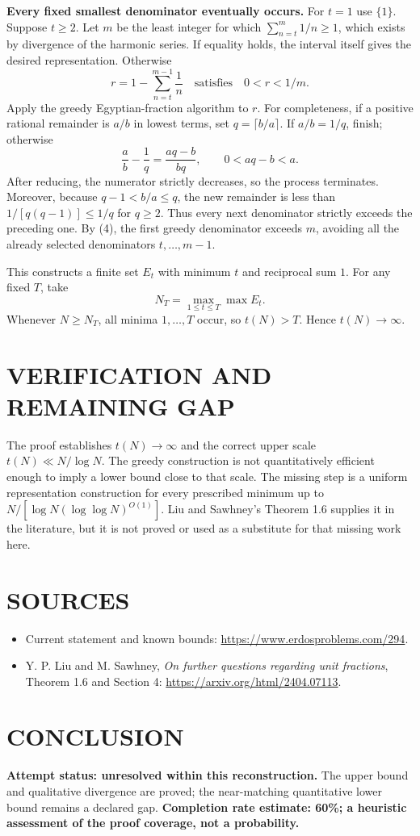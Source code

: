 \textbf{Every fixed smallest denominator eventually occurs.} For $t=1$ use $\{1\}$. Suppose $t\geq2$. Let $m$ be the least integer for which $\sum_{n=t}^m1/n\geq1$, which exists by divergence of the harmonic series. If equality holds, the interval itself gives the desired representation. Otherwise
\[
r=1-\sum_{n=t}^{m-1}\frac1n\quad\text{satisfies}\quad0<r<1/m.
\tag{4}
\]
Apply the greedy Egyptian-fraction algorithm to $r$. For completeness, if a positive rational remainder is $a/b$ in lowest terms, set $q=\lceil b/a\rceil$. If $a/b=1/q$, finish; otherwise
\[
\frac ab-\frac1q=\frac{aq-b}{bq},\qquad 0<aq-b<a.
\tag{5}
\]
After reducing, the numerator strictly decreases, so the process terminates. Moreover, because $q-1<b/a\leq q$, the new remainder is less than $1/[q(q-1)]\leq1/q$ for $q\geq2$. Thus every next denominator strictly exceeds the preceding one. By (4), the first greedy denominator exceeds $m$, avoiding all the already selected denominators $t,\ldots,m-1$.

This constructs a finite set $E_t$ with minimum $t$ and reciprocal sum $1$. For any fixed $T$, take
\[
N_T=\max_{1\leq t\leq T}\max E_t.
\]
Whenever $N\geq N_T$, all minima $1,\ldots,T$ occur, so $t(N)>T$. Hence $t(N)\to\infty$.

\section{VERIFICATION AND REMAINING GAP}
The proof establishes $t(N)\to\infty$ and the correct upper scale $t(N)\ll N/\log N$. The greedy construction is not quantitatively efficient enough to imply a lower bound close to that scale. The missing step is a uniform representation construction for every prescribed minimum up to $N/[\log N(\log\log N)^{O(1)}]$. Liu and Sawhney's Theorem 1.6 supplies it in the literature, but it is not proved or used as a substitute for that missing work here.

\section{SOURCES}
\begin{itemize}
\item Current statement and known bounds: \url{https://www.erdosproblems.com/294}.
\item Y. P. Liu and M. Sawhney, \emph{On further questions regarding unit fractions}, Theorem 1.6 and Section 4: \url{https://arxiv.org/html/2404.07113}.
\end{itemize}
\section{CONCLUSION}
\textbf{Attempt status: unresolved within this reconstruction.}
The upper bound and qualitative divergence are proved; the near-matching quantitative lower bound remains a declared gap.
\textbf{Completion rate estimate: 60\%; a heuristic assessment of the proof coverage, not a probability.}
